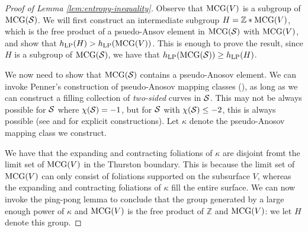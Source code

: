 \documentclass[12pt, reqno]{amsart}
\begin{document}
\begin{proof}[Proof of Lemma \ref{lem:entropy-inequality}]
  Observe that $\mathrm{MCG}(V)$ is a subgroup of $\mathrm{MCG}(\mathcal{S})$.
  We will first construct an intermediate subgroup $H = \mathbb{Z} * \mathrm{MCG}(V)$, which is the free product of a psuedo-Ansov element in $\mathrm{MCG}(\mathcal{S})$ with $\mathrm{MCG}(V)$, and show that $h_{\mathrm{LP}}(H) > h_{\mathrm{LP}}(\mathrm{MCG}(V))$.
  This is enough to prove the result, since $H$ is a subgroup of $\mathrm{MCG}(\mathcal{S})$, we have that $h_{\mathrm{LP}}(\mathrm{MCG}(\mathcal{S})) \geq h_{\mathrm{LP}}(H)$.

  We now need to show that $\mathrm{MCG}(\mathcal{S})$ contains a pseudo-Anosov element.
  We can invoke Penner's construction of pseudo-Anosov mapping classes (\cite[Theorem 4.1]{penner1988construction}), as long as we can construct a filling collection of \emph{two-sided} curves in $\mathcal{S}$.
  This may not be always possible for $\mathcal{S}$ where $\chi(\mathcal{S}) = -1$, but for $\mathcal{S}$ with $\chi(\mathcal{S}) \leq -2$, this is always possible (see \cite{Liechti2018MinimalPS} and \cite{khan2023pseudo} for explicit constructions).
  Let $\kappa$ denote the pseudo-Anosov mapping class we construct.

  We have that the expanding and contracting foliations of $\kappa$ are disjoint fromt the limit set of $\mathrm{MCG}(V)$ in the Thurston boundary.
  This is because the limit set of $\mathrm{MCG}(V)$ can only consist of foliations supported on the subsurface $V$, whereas the expanding and contracting foliations of $\kappa$ fill the entire surface.
  We can now invoke the ping-pong lemma to conclude that the group generated by a large enough power of $\kappa$ and $\mathrm{MCG}(V)$ is the free product of $\mathbb{Z}$ and $\mathrm{MCG}(V)$: we let $H$ denote this group.


\end{proof}
\end{document}
